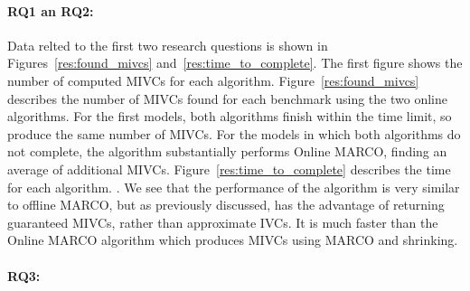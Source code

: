 \paragraph{RQ1 an RQ2:}
Data relted to the first two research questions is shown in Figures~\ref{res:found_mivcs} and~\ref{res:time_to_complete}.  The first figure shows the number of computed MIVCs for each algorithm.    Figure~\ref{res:found_mivcs} describes the number of MIVCs found for each benchmark using the two online algorithms.  For the first  models, both algorithms finish within the time limit, so produce the same number of MIVCs.  For the  models in which both algorithms do not complete, the  algorithm substantially performs Online MARCO, finding an average of  additional MIVCs. Figure~\ref{res:time_to_complete} describes the time for each algorithm. .  We see that the performance of the  algorithm is very similar to offline MARCO, but as previously discussed, has the advantage of returning guaranteed MIVCs, rather than approximate IVCs.  It is much faster than the Online MARCO algorithm which produces MIVCs using MARCO and shrinking.

\paragraph{RQ3:}  



